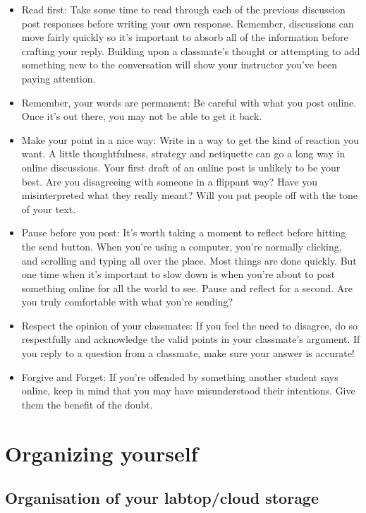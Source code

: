 \documentclass{article}
\begin{document}
\begin{itemize}
    \item Read first:
    Take some time to read through each of the previous discussion post responses before writing your own response. Remember, discussions can move fairly quickly so it’s important to absorb all of the information before crafting your reply. Building upon a classmate’s thought or attempting to add something new to the conversation will show your instructor you’ve been paying attention.
    \item Remember, your words are permanent: Be careful with what you post online. Once it's out there, you may not be able to get it back.
    \item Make your point in a nice way:
    Write in a way to get the kind of reaction you want. A little thoughtfulness, strategy and netiquette can go a long way in online discussions.
    Your first draft of an online post is unlikely to be your best. Are you disagreeing with someone in a flippant way? Have you misinterpreted what they really meant? Will you put people off with the tone of your text.
    \item Pause before you post:
    It's worth taking a moment to reflect before hitting the send button.
    When you're using a computer, you're normally clicking, and scrolling and typing all over the place. Most things are done quickly. But one time when it's important to slow down is when you're about to post something online for all the world to see. Pause and reflect for a second. Are you truly comfortable with what you're sending?
    \item Respect the opinion of your classmates: 
    If you feel the need to disagree, do so respectfully and acknowledge the valid points in your classmate's argument. If you reply to a question from a classmate, make sure your answer is accurate!
    \item Forgive and Forget: 
    If you’re offended by something another student says online, keep in mind that you may have misunderstood their intentions. Give them the benefit of the doubt.
   
 \end{itemize}
\pagebreak
 \section{Organizing yourself}
 \subsection{Organisation of your labtop/cloud storage}
\end{document}
